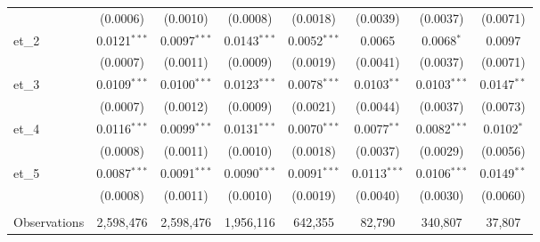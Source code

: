 \begin{tabular}{lccccccc}
                      & (0.0006)        & (0.0010)                      & (0.0008)         & (0.0018)                          & (0.0039)                          & (0.0037)                                        & (0.0071)\\   
   et\_2              & 0.0121$^{***}$  & 0.0097$^{***}$                & 0.0143$^{***}$   & 0.0052$^{***}$                    & 0.0065                            & 0.0068$^{*}$                                    & 0.0097\\   
                      & (0.0007)        & (0.0011)                      & (0.0009)         & (0.0019)                          & (0.0041)                          & (0.0037)                                        & (0.0071)\\   
   et\_3              & 0.0109$^{***}$  & 0.0100$^{***}$                & 0.0123$^{***}$   & 0.0078$^{***}$                    & 0.0103$^{**}$                     & 0.0103$^{***}$                                  & 0.0147$^{**}$\\   
                      & (0.0007)        & (0.0012)                      & (0.0009)         & (0.0021)                          & (0.0044)                          & (0.0037)                                        & (0.0073)\\   
   et\_4              & 0.0116$^{***}$  & 0.0099$^{***}$                & 0.0131$^{***}$   & 0.0070$^{***}$                    & 0.0077$^{**}$                     & 0.0082$^{***}$                                  & 0.0102$^{*}$\\   
                      & (0.0008)        & (0.0011)                      & (0.0010)         & (0.0018)                          & (0.0037)                          & (0.0029)                                        & (0.0056)\\   
   et\_5              & 0.0087$^{***}$  & 0.0091$^{***}$                & 0.0090$^{***}$   & 0.0091$^{***}$                    & 0.0113$^{***}$                    & 0.0106$^{***}$                                  & 0.0149$^{**}$\\   
                      & (0.0008)        & (0.0011)                      & (0.0010)         & (0.0019)                          & (0.0040)                          & (0.0030)                                        & (0.0060)\\   
    \\
   Observations       & 2,598,476       & 2,598,476                     & 1,956,116        & 642,355                           & 82,790                            & 340,807                                         & 37,807\\  

\end{tabular}
